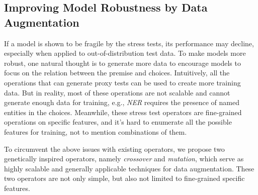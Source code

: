 


\subsection{Improving Model Robustness by Data Augmentation}
\label{sec:aug}
If a model is shown to be fragile by the stress tests, 
its performance may decline, especially when applied to out-of-distribution test data.
To make models more robust, one natural thought is to generate more data to encourage models to focus on the 
relation between the premise and choices.
Intuitively, all the operations that can generate proxy tests
can be used to create more training data.
But in reality, most of these operations are not scalable and 
cannot generate enough data for training, e.g., \textit{NER} requires the presence of named entities in the choices.
Meanwhile, these stress test operators are fine-grained operations on specific features, 
and it's hard to enumerate all the possible features for training, not to mention 
combinations of them. 

To circumvent the above issues with existing operators, 
we propose two genetically inspired operators, 
namely \textit{crossover} and \textit{mutation}, 
which serve as highly scalable and generally 
applicable techniques for data augmentation.
These two operators are  
not only simple, but also not limited to fine-grained specific features. 

